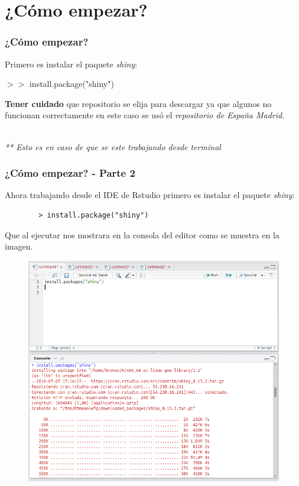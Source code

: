 \documentclass{beamer}
\begin{document}
\section{¿Cómo empezar?}
\begin{frame}
	\frametitle{¿Cómo empezar?}
	Primero es instalar el paquete \emph{shiny}:
	
	\begin{block}{}
		$>>$ install.package("shiny")
	\end{block}
	
	\textbf{Tener cuidado} que repositorio se elija para descargar ya que algunos no funcionan correctamente en este caso se usó el \textit{repositorio de España Madrid}.\\\
	
	\textit{** Esto es en caso de que se este trabajando desde terminal}

\end{frame}
\begin{frame}[fragile]
	\frametitle{¿Cómo empezar? - Parte 2}
	\begin{multicols}{2}
		Ahora trabajando desde el IDE de Rstudio primero es instalar el paquete \emph{shiny}:
		
		\begin{verbatim}
		> install.package("shiny")
		\end{verbatim}
		Que al ejecutar nos mostrara en la consola del editor como se muestra en la imagen.
		\begin{figure}[h!]
			\includegraphics[scale=0.2]{instalacion}
		\end{figure}
	\end{multicols} 
	
\end{frame}
\end{document}
